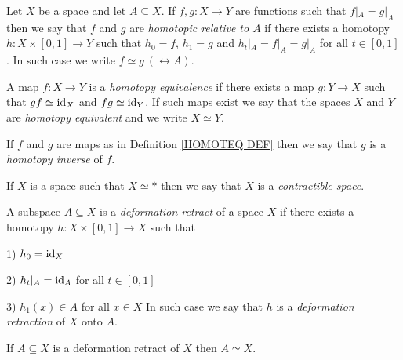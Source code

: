 \begin{definition}
Let $X$ be a space and let $A\subseteq X$. If $f, g\colon X \to Y$ are functions such that $f|_{A} = g|_{A}$
then we say that $f$ and $g$ are \emph{homotopic relative to $A$} if there exists a homotopy 
$h\colon X \times [0, 1] \to Y$ such that $h_{0} = f$, $h_{1} = g$ and $h_{t}|_{A} = f|_{A} = g|_{A}$ for all 
$t\in [0, 1]$. In  such case we write $f\simeq g \ (\rel A)$. 
\end{definition}




\begin{definition}
\label{HOMOTEQ DEF}
A map $f\colon X \to Y$ is a \emph{homotopy equivalence} if there exists a map $g\colon Y \to X$ 
such that $gf \simeq \mathrm{id}_{X}$ and $fg\simeq \mathrm{id}_{Y}$. If such maps exist  we say that the spaces
$X$ and $Y$ are \emph{homotopy equivalent} and we write $X \simeq Y$. 
\end{definition}

\begin{note}
If $f$ and $g$ are maps as in Definition \ref{HOMOTEQ DEF} then we say that $g$ is 
a \emph{homotopy inverse} of $f$.  
\end{note}

\begin{definition}
If $X$ is a space such that $X \simeq \ast$ then we say that $X$ is a \emph{contractible space}. 
\end{definition}


\begin{definition}
\label{DEFORM RETRACT DEF}
A subspace $A \subseteq X$ is a \emph{deformation retract} of a space $X$ if there exists a homotopy 
$h\colon X \times [0, 1] \to X$ such that 
\benu
\item[1)] $h_{0} = \mathrm{id}_{X}$
\item[2)] $h_{t}|_{A} = \mathrm{id}_{A}$ for all  $t\in [0, 1]$ 
\item[3)] $h_{1}(x)\in A$ for all $x\in X$
\eenu
In such case we say that $h$ is a \emph{deformation retraction}
of $X$ onto $A$. 

\end{definition}  

\begin{proposition}
\label{DEFORM RETRACT HOMOT EQ PROP}
If $A\subseteq X$ is a deformation retract of $X$ then $A\simeq X$. 
\end{proposition}



